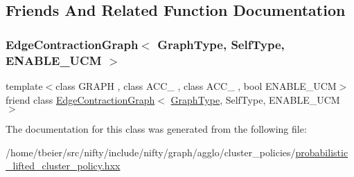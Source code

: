 \subsection{Friends And Related Function Documentation}
\mbox{\label{classnifty_1_1graph_1_1agglo_1_1ProbabilisticLiftedClusterPolicy_a6939aa4c6113ba9c44fd5e048687ba92}} 
\subsubsection{\texorpdfstring{Edge\+Contraction\+Graph$<$ Graph\+Type, Self\+Type, E\+N\+A\+B\+L\+E\+\_\+\+U\+C\+M $>$}{EdgeContractionGraph< GraphType, SelfType, ENABLE\_UCM >}}
{\footnotesize\ttfamily template$<$class G\+R\+A\+PH , class A\+C\+C\+\_ , class A\+C\+C\+\_ , bool E\+N\+A\+B\+L\+E\+\_\+\+U\+CM$>$ \\
friend class \hyperlink{classnifty_1_1graph_1_1EdgeContractionGraph}{Edge\+Contraction\+Graph}$<$ \hyperlink{classnifty_1_1graph_1_1agglo_1_1ProbabilisticLiftedClusterPolicy_a196d3d530d5eed9f8a40172dcd93fa41}{Graph\+Type}, Self\+Type, E\+N\+A\+B\+L\+E\+\_\+\+U\+CM $>$\hspace{0.3cm}{\ttfamily [friend]}}



The documentation for this class was generated from the following file\+:\begin{DoxyCompactItemize}
\item 
/home/tbeier/src/nifty/include/nifty/graph/agglo/cluster\+\_\+policies/\hyperlink{probabilistic__lifted__cluster__policy_8hxx}{probabilistic\+\_\+lifted\+\_\+cluster\+\_\+policy.\+hxx}\end{DoxyCompactItemize}
